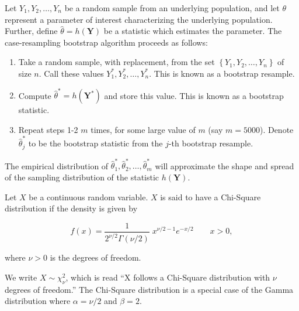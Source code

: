 \documentclass[
  letterpaper,
  DIV=11,
  numbers=noendperiod]{scrreprt}
\providecommand{\tightlist}{%
  \setlength{\itemsep}{0pt}\setlength{\parskip}{0pt}}\usepackage{longtable,booktabs,array}
\theoremstyle{plain}
\theoremstyle{definition}
\theoremstyle{definition}
\theoremstyle{remark}
\begin{document}
\begin{description}
\tightlist
\item[Case-Resampling Bootstrap (Definition~\ref{def-case-bootstrap})]
Let \(Y_1, Y_2, \dotsc, Y_n\) be a random sample from an underlying
population, and let \(\theta\) represent a parameter of interest
characterizing the underlying population. Further, define
\(\widehat{\theta} = h(\mathbf{Y})\) be a statistic which estimates the
parameter. The case-resampling bootstrap algorithm proceeds as follows:
\end{description}

\begin{enumerate}
\def\labelenumi{\arabic{enumi}.}
\tightlist
\item
  Take a random sample, with replacement, from the set
  \(\left\{Y_1, Y_2, \dotsc, Y_n\right\}\) of size \(n\). Call these
  values \(Y_1^*, Y_2^*, \dotsc, Y_n^*\). This is known as a bootstrap
  resample.
\item
  Compute \(\widehat{\theta}^* = h\left(\mathbf{Y}^*\right)\) and store
  this value. This is known as a bootstrap statistic.
\item
  Repeat steps 1-2 \(m\) times, for some large value of \(m\) (say
  \(m = 5000\)). Denote \(\widehat{\theta}^*_j\) to be the bootstrap
  statistic from the \(j\)-th bootstrap resample.
\end{enumerate}

The empirical distribution of
\(\widehat{\theta}_1^*, \widehat{\theta}_2^*, \dotsc, \widehat{\theta}_m^*\)
will approximate the shape and spread of the sampling distribution of
the statistic \(h(\mathbf{Y})\).

\begin{description}
\tightlist
\item[Chi-Square Distribution
(Definition~\ref{def-chi-square-distribution})]
Let \(X\) be a continuous random variable. \(X\) is said to have a
Chi-Square distribution if the density is given by
\end{description}

\[f(x) = \frac{1}{2^{\nu/2}\Gamma (\nu/2)}\;x^{\nu/2-1}e^{-x/2} \qquad x > 0,\]

where \(\nu > 0\) is the degrees of freedom.

We write \(X \sim \chi^2_{\nu}\), which is read ``X follows a Chi-Square
distribution with \(\nu\) degrees of freedom.'' The Chi-Square
distribution is a special case of the Gamma distribution where
\(\alpha = \nu/2\) and \(\beta = 2\).
\end{document}
